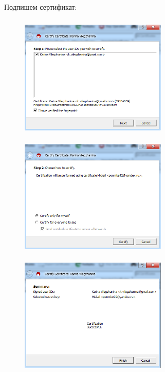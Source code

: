 \documentclass[utf8x, 12pt]{G7-32}
\begin{document}
Подпишем сертификат:
\begin{figure}[hhh!]
	\begin{center}
		\includegraphics[width=7cm, height=6cm]{img/5_2}
		\includegraphics[width=7cm, height=6cm]{img/5_3}
		\includegraphics[width=7cm, height=6cm]{img/5_4}
	\end{center}
\end{figure}	


 \newpage
\end{document}
